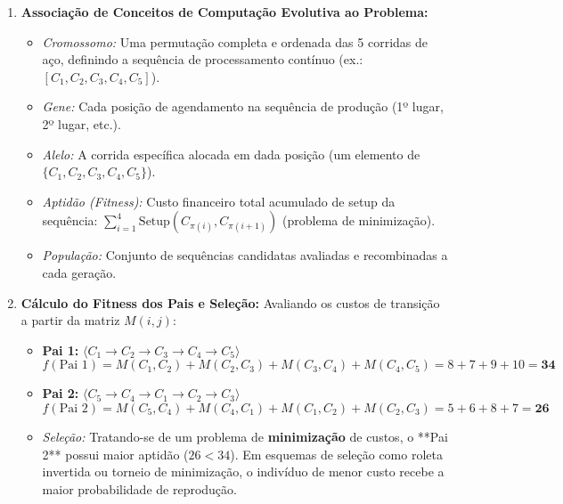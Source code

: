 \begin{enumerate}[label=(\alph*)]
    \item \textbf{Associação de Conceitos de Computação Evolutiva ao Problema:}
    \begin{itemize}
        \item \textit{Cromossomo:} Uma permutação completa e ordenada das 5 corridas de aço, definindo a sequência de processamento contínuo (ex.: $[C_1, C_2, C_3, C_4, C_5]$).
        \item \textit{Gene:} Cada posição de agendamento na sequência de produção (1º lugar, 2º lugar, etc.).
        \item \textit{Alelo:} A corrida específica alocada em dada posição (um elemento de $\{C_1, C_2, C_3, C_4, C_5\}$).
        \item \textit{Aptidão (\textit{Fitness}):} Custo financeiro total acumulado de setup da sequência: $\sum_{i=1}^{4} \text{Setup}(C_{\pi(i)}, C_{\pi(i+1)})$ (problema de minimização).
        \item \textit{População:} Conjunto de sequências candidatas avaliadas e recombinadas a cada geração.
    \end{itemize}

    \item \textbf{Cálculo do Fitness dos Pais e Seleção:}
    Avaliando os custos de transição a partir da matriz $M(i, j)$:
    \begin{itemize}
        \item \textbf{Pai 1:} $\langle C_1 \to C_2 \to C_3 \to C_4 \to C_5 \rangle$
        \begin{equation*}
            f(\text{Pai 1}) = M(C_1, C_2) + M(C_2, C_3) + M(C_3, C_4) + M(C_4, C_5) = 8 + 7 + 9 + 10 = \mathbf{34}
        \end{equation*}
        \item \textbf{Pai 2:} $\langle C_5 \to C_4 \to C_1 \to C_2 \to C_3 \rangle$
        \begin{equation*}
            f(\text{Pai 2}) = M(C_5, C_4) + M(C_4, C_1) + M(C_1, C_2) + M(C_2, C_3) = 5 + 6 + 8 + 7 = \mathbf{26}
        \end{equation*}
        \item \textit{Seleção:} Tratando-se de um problema de \textbf{minimização} de custos, o **Pai 2** possui maior aptidão ($26 < 34$). Em esquemas de seleção como roleta invertida ou torneio de minimização, o indivíduo de menor custo recebe a maior probabilidade de reprodução.
    \end{itemize}


\end{enumerate}

